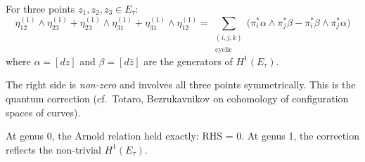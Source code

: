 \begin{theorem}
\label{thm:arnold-genus1}
For three points $z_1, z_2, z_3 \in E_\tau$:
\begin{equation}
\eta_{12}^{(1)} \wedge \eta_{23}^{(1)} + \eta_{23}^{(1)} \wedge \eta_{31}^{(1)}
+ \eta_{31}^{(1)} \wedge \eta_{12}^{(1)} = \sum_{\substack{(i,j,k) \\ \text{cyclic}}} \bigl(\pi_i^*\alpha \wedge \pi_j^*\beta - \pi_i^*\beta \wedge \pi_j^*\alpha\bigr)
\end{equation}
where $\alpha = [dz]$ and $\beta = [d\bar{z}]$ are the generators of $H^1(E_\tau)$.

The right side is \emph{non-zero} and involves all three points symmetrically. This is the quantum correction (cf.\ Totaro, Bezrukavnikov on cohomology of configuration spaces of curves).

At genus 0, the Arnold relation held exactly: RHS = 0.
At genus 1, the correction reflects the non-trivial $H^1(E_\tau)$.
\end{theorem}

